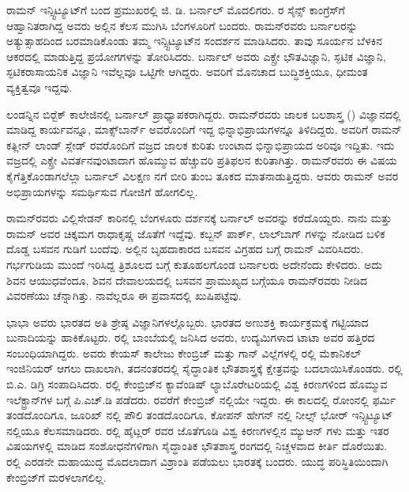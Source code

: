 
ರಾಮನ್ ಇನ್ಸ್ಟಿಟ್ಯೂಟ್‍ಗೆ ಬಂದ ಪ್ರಮುಖರಲ್ಲಿ ಜಿ. ಡಿ. ಬರ್ನಾಲ್ ಮೊದಲಿಗರು. ರ ಸೈನ್ಸ್ ಕಾಂಗ್ರೆಸ್‍ಗೆ ಆಹ್ವಾನಿತರಾಗಿದ್ದ ಅವರು ಅಲ್ಲಿನ ಕೆಲಸ ಮುಗಿಸಿ ಬೆಂಗಳೂರಿಗೆ ಬಂದರು. ರಾಮನ್‍ರವರು ಬರ್ನಾಲರನ್ನು ಅತ್ಯುತ್ಸಾಹದಿಂದ ಬರಮಾಡಿಕೊಂಡು ತಮ್ಮ ಇನ್ಸ್ಟಿಟ್ಯೂಟ್‍ನ ಸಂದರ್ಶನ ಮಾಡಿಸಿದರು. ತಾವು ಸೂರ್ಯನ ಬೆಳಕಿನ ಆಕರದಲ್ಲಿ ಮಾಡುತ್ತಿದ್ದ ಪ್ರಯೋಗಗಳನ್ನು ತೋರಿಸಿದರು. ಬರ್ನಾಲ್ ಅವರು ಎಕ್ಸ್\enginline{-}ರೇ ಭೌತವಿಜ್ಞಾನಿ, ಸ್ಫಟಿಕ ವಿಜ್ಞಾನಿ, ಸ್ಫಟಿಕರಾಸಾಯನಿಕ ವಿಜ್ಞಾನಿ ಇವೆಲ್ಲವೂ ಒಟ್ಟಿಗೇ ಆಗಿದ್ದರು. ಅವರಿಗೆ ಮೊನಚಾದ ಬುದ್ಧಿಶಕ್ತಿಯೂ, ಧೀಮಂತ ವ್ಯಕ್ತಿತ್ವವೂ ಇದ್ದವು.

ಲಂಡನ್ನಿನ ಬಿರ್‍ಬೆಕ್ ಕಾಲೇಜಿನಲ್ಲಿ ಬರ್ನಾಲ್ ಪ್ರಾಧ್ಯಾಪಕರಾಗಿದ್ದರು. ರಾಮನ್‍ರವರು ಜಾಲಕ ಬಲಶಾಸ್ತ್ರ () ವಿಜ್ಞಾನದಲ್ಲಿ ಮಾಡಿದ್ದ ಕಾರ್ಯವನ್ನೂ, ಮಾಕ್ಸ್‌ಬಾರ್ನ್ ಅವರೊಂದಿಗೆ ಇದ್ದ ಭಿನ್ನಾಭಿಪ್ರಾಯಗಳನ್ನೂ ತಿಳಿದಿದ್ದರು. ಅವರಿಗೆ ರಾಮನ್ ಕತ್ಲೀನ್ ಲಾಂಡ್ ಸ್ಲೇಡ್ ರವರೊಂದಿಗೆ ವಜ್ರದ ಜಾಲಕ ಕುರಿತು ಉಂಟಾದ ಭಿನ್ನಾಭಿಪ್ರಾಯದ ಅರಿವೂ ಇದ್ದಿತು. ಇದು ವಜ್ರದಲ್ಲಿ ಎಕ್ಸ್\enginline{-}ರೇ ವಿವರ್ತನವುಂಟಾದಾಗ ಹೊಮ್ಮುವ ಹೆಚ್ಚುವರಿ ಪ್ರತಿಫಲನ ಕುರಿತಾಗಿತ್ತು. ರಾಮನ್‍ರವರು ಈ ವಿಷಯ ಕೈಗೆತ್ತಿಕೊಂಡಾಗಲೆಲ್ಲಾ ಬರ್ನಾಲ್ ವಿಲಕ್ಷಣ ನಗೆ ಬೀರಿ ತುಂಬ ತೂಕದ ಮಾತ\-ನಾಡುತ್ತಿದ್ದರು. ಆವರು ರಾಮನ್ ಅವರ ಅಭಿಪ್ರಾಯಗಳನ್ನು ಸಮರ್ಥಿಸುವ ಗೋಜಿಗೆ ಹೋಗಲಿಲ್ಲ.

ರಾಮನ್‍ರವರು ವಿಲ್ಲಿಸೇಡನ್ ಕಾರಿನಲ್ಲಿ ಬೆಂಗಳೂರು ದರ್ಶನಕ್ಕೆ ಬರ್ನಾಲ್ ಅವರನ್ನು ಕರೆದೊಯ್ದರು. ನಾನು ಮತ್ತು ರಾಮನ್ ಅವರ ಚಿಕ್ಕಮಗ ರಾಧಾಕೃಷ್ಣ ಜೊತೆಗೆ ಇದ್ದೆವು. ಕಬ್ಬನ್ ಪಾರ್ಕ್, ಲಾಲ್‍ಬಾಗ್ ಗಳನ್ನು ನೋಡಿದ ಬಳಿಕ ದೊಡ್ಡ ಬಸವನ ಗುಡಿಗೆ ಬಂದೆವು. ಅಲ್ಲಿನ ಬೃಹದಾಕಾರದ ಬಸವನ ವಿಗ್ರಹದ ಬಗ್ಗೆ ರಾಮನ್ ವಿವರಿಸಿದರು. ಗರ್ಭಗುಡಿಯ ಮುಂದೆ ಇರಿಸಿದ್ದ ತ್ರಿಶೂಲದ ಬಗ್ಗೆ ಕುತೂಹಲಗೊಂಡ ಬರ್ನಾಲರು ಅದೇನೆಂದು ಕೇಳಿದರು. ಅದು ಶಿವನ ಆಯುಧವೆಂದೂ, ಶಿವನ ದೇವಾಲಯದಲ್ಲಿ ಬಸವನ ಪ್ರಾಮುಖ್ಯದ ಬಗ್ಗೆಯೂ ರಾಮನ್‍ರವರು ನೀಡಿದ ವಿವರಣೆಯು ಚೆನ್ನಾಗಿತ್ತು. ನಾವೆಲ್ಲರೂ ಈ ಪ್ರವಾಸದಲ್ಲಿ ಖುಷಿಪಟ್ಟೆವು.



ಭಾಭಾ ಅವರು ಭಾರತದ ಅತಿ ಶ್ರೇಷ್ಠ ವಿಜ್ಞಾನಿಗಳಲ್ಲೊಬ್ಬರು. ಭಾರತದ ಅಣುಶಕ್ತಿ ಕಾರ್ಯ\-ಕ್ರಮಕ್ಕೆ ಗಟ್ಟಿಯಾದ ಬುನಾದಿಯನ್ನು ಹಾಕಿಕೊಟ್ಟರು. ರಲ್ಲಿ ಬಾಂಬೆಯಲ್ಲಿ ಜನಿಸಿದ ಅವರು, ಉದ್ಯಮಿಗಳಾದ ಟಾಟಾ ಅವರ ಹತ್ತಿರದ ಸಂಬಂಧಿಯಾಗಿದ್ದರು. ಅವರು ಕೇಯಸ್ ಕಾಲೇಜು ಕೇಂಬ್ರಿಜ್ ಮತ್ತು ಗಾನ್ ವಿಲ್ಲೆಗಳಲ್ಲಿ ರಲ್ಲಿ ಮೆಕಾನಿಕಲ್ ಇಂಜಿನಿಯರ್ ಆಗಲು ದಾಖಲಾಗಿ, ತದನಂತರದಲ್ಲಿ ಸೈದ್ಧಾಂತಿಕ ಭೌತಶಾಸ್ತ್ರಕ್ಕೆ ಕ್ಷೇತ್ರವನ್ನು ಬದಲಾಯಿಸಿಕೊಂಡರು. ರಲ್ಲಿ ಬಿ.ಎ. ಡಿಗ್ರಿ ಸಂಪಾದಿಸಿದರು. ರಲ್ಲಿ ಕೇಂಬ್ರಿಜ್‍ನ ಕ್ಯಾವೆಂಡಿಷ್ ಲ್ಯಾಬೊರೇಟರಿಯಲ್ಲಿ ವಿಶ್ವ ಕಿರಣಗಳಿಂದ ಹೊಮ್ಮುವ ಇಲೆಕ್ಟ್ರಾನ್‍ಗಳ ಬಗ್ಗೆ ಪಿ.ಎಚ್.ಡಿ ಪಡೆದರು. ರವರೆಗೆ ಕೇಂಬ್ರಿಜ್ ನಲ್ಲಿಯೇ ಇದ್ದರು. ಈ ಕಾಲದಲ್ಲಿ ರೋಂನಲ್ಲಿ ಫರ್ಮಿ ತಂಡದೊಂದಿಗೂ, ಜೂರಿಖ್ ನಲ್ಲಿ ಪೌಲಿ ತಂಡದೊಂದಿಗೂ, ಕೋಪನ್ ಹೇಗನ್ ನಲ್ಲಿ ನೀಲ್ಸ್ ಭೋರ್ ಇನ್ಸ್ಟಿಟ್ಯೂಟ್ ನಲ್ಲಿಯೂ ಕೆಲಸಮಾಡಿದರು. ರಲ್ಲಿ ಹೈಟ್ಲರ್ ರವರ ಜೊತೆಗೂಡಿ ವಿಶ್ವ ಕಿರಣಗಳಲ್ಲಿನ ಮ್ಯುಆನ್ ಗಳು ಮತ್ತು ಇತರ ವಿಷಯಗಳಲ್ಲಿ ಮಾಡಿದ ಸಂಶೋಧನೆಗಳಿಗಾಗಿ ಸೈದ್ಧಾಂತಿಕ ಭೌತಶಾಸ್ತ್ರ ರಂಗದಲ್ಲಿ ನಿಚ್ಚಳವಾದ ಕೀರ್ತಿ ದೊರೆಯಿತು. ರಲ್ಲಿ ಎರಡನೇ ಮಹಾಯುದ್ಧ ಮೊದಲಾದಾಗ ವಿಶ್ರಾಂತಿ ಪಡೆಯಲು ಭಾರತಕ್ಕೆ ಬಂದರು. ಯುದ್ಧ ಪರಿಸ್ಥಿತಿಯಿಂದಾಗಿ ಕೇಂಬ್ರಿಜ್‍ಗೆ ಮರಳಲಾಗಲಿಲ್ಲ.


